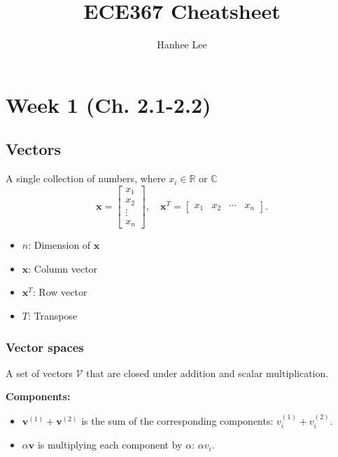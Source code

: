 \documentclass{article}
\title{ECE367 Cheatsheet}
\author{Hanhee Lee}
\begin{document}
\maketitle

\tableofcontents

\listoffigures

\listoftables

\section{Week 1 (Ch. 2.1-2.2)}
    \subsection{Vectors}
        \begin{definition}
            A single collection of numbers, where \( x_i \in \mathbb{R}\) or \(\mathbb{C}\)
            \begin{equation*}
                \mathbf{x} = \begin{bmatrix}
                    x_1 \\
                    x_2 \\
                    \vdots \\
                    x_n
                \end{bmatrix}, \quad 
                \mathbf{x}^T = \begin{bmatrix}
                    x_1 & x_2 & \cdots & x_n
                \end{bmatrix}.
            \end{equation*}
            
            \begin{itemize}
                \item $n$: Dimension of $\mathbf{x}$
                \item $\mathbf{x}$: Column vector
                \item $\mathbf{x}^T$: Row vector
                \item $T$: Transpose
            \end{itemize}
        \end{definition}

    \subsubsection{Vector spaces}
        \begin{definition}
            A set of vectors \(\mathcal{V}\) that are closed under addition and scalar multiplication.
            \vspace{1em}

            \textbf{Components:}
            \begin{itemize}
                \item $\mathbf{v}^{(1)}+\mathbf{v}^{(2)}$ is the sum of the corresponding components: $v_{i}^{(1)}+v_{i}^{(2)}$.
                \item $\alpha \mathbf{v}$ is multiplying each component by $\alpha$: $\alpha v_{i}$.
            \end{itemize}

        \end{definition}
\end{document}
